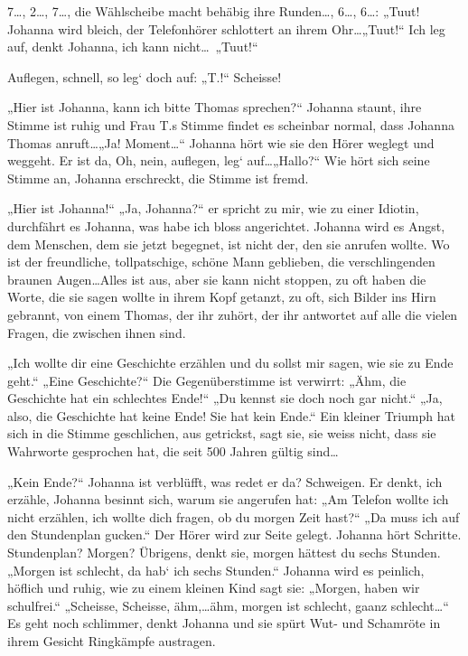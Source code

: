\documentclass[10pt,titlepage,a5paper]{book}
\begin{document}
7\dots , 2\dots , 7\dots, die Wählscheibe macht behäbig ihre Runden\dots , 6\dots, 6\dots : „Tuut! Johanna wird bleich, der Telefonhörer schlottert an ihrem Ohr\dots  „Tuut!“ Ich leg auf, denkt Johanna, ich kann nicht\dots \ „Tuut!“

Auflegen, schnell, so leg` doch auf: „T.!“ Scheisse!

„Hier ist Johanna, kann ich bitte Thomas sprechen?“ Johanna staunt, ihre Stimme ist ruhig und Frau T.s Stimme findet es scheinbar normal, dass Johanna Thomas anruft\dots  „Ja! Moment\dots “ Johanna hört wie sie den Hörer weglegt und weggeht. Er ist da, Oh, nein, auflegen, leg` auf\dots  „Hallo?“ Wie hört sich seine Stimme an, Johanna erschreckt, die Stimme ist fremd.

„Hier ist Johanna!“ „Ja, Johanna?“ er spricht zu mir, wie zu einer Idiotin, durchfährt es Johanna, was habe ich bloss angerichtet. Johanna wird es Angst, dem Menschen, dem sie jetzt begegnet, ist nicht der, den sie anrufen wollte. Wo ist der freundliche, tollpatschige, schöne Mann geblieben, die verschlingenden braunen Augen\dots  Alles ist aus, aber sie kann nicht stoppen, zu oft haben die Worte, die sie sagen wollte in ihrem Kopf getanzt, zu oft, sich Bilder ins Hirn gebrannt, von einem Thomas, der ihr zuhört, der ihr antwortet auf alle die vielen Fragen, die zwischen ihnen sind.

„Ich wollte dir eine Geschichte erzählen und du sollst mir sagen, wie sie zu Ende geht.“ „Eine Geschichte?“ Die Gegenüberstimme ist verwirrt: „Ähm, die Geschichte hat ein schlechtes Ende!“ „Du kennst sie doch noch gar nicht.“ „Ja, also, die Geschichte hat keine Ende! Sie hat kein Ende.“ Ein kleiner Triumph hat sich in die Stimme geschlichen, aus getrickst, sagt sie, sie weiss nicht, dass sie Wahrworte gesprochen hat, die seit 500 Jahren gültig sind\dots 

„Kein Ende?“ Johanna ist verblüfft, was redet er da? Schweigen.
Er denkt, ich erzähle, Johanna besinnt sich, warum sie angerufen hat: „Am Telefon wollte ich nicht erzählen, ich wollte dich fragen, ob du morgen Zeit hast?“ „Da muss ich auf den Stundenplan gucken.“ Der Hörer wird zur Seite gelegt. Johanna hört Schritte. Stundenplan? Morgen? Übrigens, denkt sie, morgen hättest du sechs Stunden. „Morgen ist schlecht, da hab` ich sechs Stunden.“ Johanna wird es peinlich, höflich und ruhig, wie zu einem kleinen Kind sagt sie: „Morgen, haben wir schulfrei.“ „Scheisse, Scheisse, ähm,\dots ähm, morgen ist schlecht, gaanz schlecht\dots “ Es geht noch schlimmer, denkt Johanna und sie spürt Wut- und Schamröte in ihrem Gesicht Ringkämpfe austragen.
\end{document}
